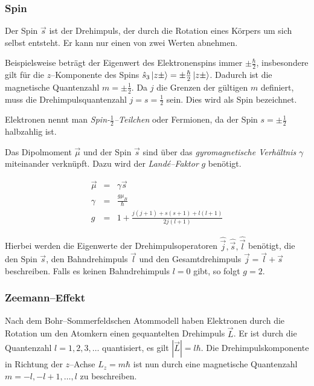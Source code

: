 \documentclass[12pt,a4paper]{scrartcl}
\numberwithin{equation}{section} %
\begin{document}
\hypertarget{spin}{ \subsubsection{Spin}\label{spin}}

Der Spin $\vec s$ ist der Drehimpuls, der durch die Rotation eines Körpers um sich selbst entsteht. Er kann nur einen von zwei Werten abnehmen.

Beispielsweise beträgt der Eigenwert des Elektronenspins immer $\pm\frac{\hbar}{2}$, insbesondere gilt für die $z$--Komponente des Spins $\hat s_3\ket{z\pm}=\pm\frac{\hbar}{2}\ket{z\pm}$. Dadurch ist die magnetische Quantenzahl $m=\pm\frac{1}{2}$. Da $j$ die Grenzen der gültigen $m$ definiert, muss die Drehimpulsquantenzahl $j=s=\frac{1}{2}$ sein. Dies wird als Spin bezeichnet.

Elektronen nennt man \emph{Spin-$\frac{1}{2}$--Teilchen} oder Fermionen, da der Spin $s=\pm\frac{1}{2}$ halbzahlig ist.

Das Dipolmoment $\vec \mu$ und der Spin $\vec s$ sind über das \emph{gyromagnetische Verhältnis} $\gamma$ miteinander verknüpft. Dazu wird der \emph{Landé--Faktor} $g$ benötigt.

\begin{eqnarray}
	\vec \mu &=& \gamma \vec{s} \label{eq:dipolmomentSpin} \\
	\gamma &=& \frac{g\mu_B}{\hbar} \label{eq:gyromag} \\
	g &=& 1 + \frac{j(j+1) + s(s+1) + l(l+1)}{2j(l+1)}
\end{eqnarray}

\noindent
Hierbei werden die Eigenwerte der Drehimpulsoperatoren $\hat{\vec j},\hat{\vec s},\hat{\vec l}$ benötigt, die den Spin $\vec s$, den Bahndrehimpuls $\vec l$ und den Gesamtdrehimpuls $\vec j = \vec l + \vec s$ beschreiben. Falls es keinen Bahndrehimpuls $l=0$ gibt, so folgt $g=2$.

\hypertarget{zeemanneffekt}{\subsubsection{Zeemann--Effekt}\label{zeemanneffekt}}

Nach dem Bohr--Sommerfeldschen Atommodell haben Elektronen durch die Rotation um den Atomkern einen gequantelten Drehimpuls $\vec{L}$. Er ist durch die Quantenzahl $l=1,2,3,\dots$ quantisiert, es gilt $|\vec{L}| = l\hbar$. Die Drehimpulskomponente in Richtung der $z$--Achse $L_z=m\hbar$ ist nun durch eine magnetische Quantenzahl $m=-l,-l+1,\dots,l$ zu beschreiben.
\end{document}

